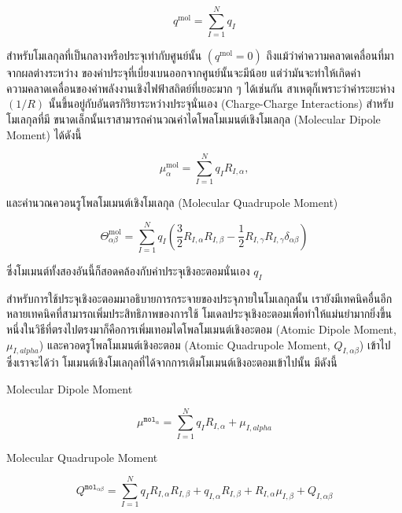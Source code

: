 \begin{equation}
    q^{\mathrm{mol}}
    =
    \sum_{I=1}^N q_I
\end{equation}

\noindent สำหรับโมเลกุลที่เป็นกลางหรือประจุเท่ากับศูนย์นั้น $(q^{\mathrm{mol}} = 0)$ ถึงแม้ว่าค่าความคลาดเคลื่อนที่มาจากผลต่างระหว่าง%
ของค่าประจุที่เบี่ยงเบนออกจากศูนย์นั้นจะมีน้อย แต่ว่ามันจะทำให้เกิดค่าความคลาดเคลื่อนของค่าพลังงานเชิงไฟฟ้าสถิตย์ที่เยอะมาก ๆ ได้เช่นกัน
สาเหตุก็เพราะว่าค่าระยะห่าง $(1 / R)$ นั้นขึ้นอยู่กับอันตรกิริยาระหว่างประจุนั่นเอง (Charge-Charge Interactions) สำหรับโมเลกุลที่มี%
ขนาดเล็กนั้นเราสามารถคำนวณค่าไดโพลโมเมนต์เชิงโมเลกุล (Molecular Dipole Moment) ได้ดังนี้

\begin{equation}
    \mu_\alpha^{\mathrm{mol}}
    =
    \sum_{I=1}^N q_I R_{I, \alpha},
\end{equation}

\noindent และคำนวณควอนรูโพลโมเมนต์เชิงโมเลกุล (Molecular Quadrupole Moment)

\begin{equation}
    \Theta_{\alpha \beta}^{\mathrm{mol}}
    =
    \sum_{I=1}^N q_I
    \left(
    \frac{3}{2} R_{I, \alpha} R_{I, \beta}
    -\frac{1}{2} R_{I, \gamma} R_{I, \gamma} \delta_{\alpha \beta}
    \right)
\end{equation}

\noindent ซึ่งโมเมนต์ทั้งสองอันนี้ก็สอดคล้องกับค่าประจุเชิงอะตอมนั่นเอง $q_I$

สำหรับการใช้ประจุเชิงอะตอมมาอธิบายการกระจายของประจุภายในโมเลกุลนั้น เรายังมีเทคนิคอื่นอีกหลายเทคนิคที่สามารถเพิ่มประสิทธิภาพของการใช้%
โมเดลประจุเชิงอะตอมเพื่อทำให้แม่นยำมากยิ่งขึ้น หนึ่งในวิธีที่ตรงไปตรงมาก็คือการเพิ่มเทอมไดโพลโมเมนต์เชิงอะตอม (Atomic Dipole Moment,
$\mu_{I,alpha}$) และควอดรูโพลโมเมนต์เชิงอะตอม (Atomic Quadrupole Moment, $Q_{I,\alpha \beta}$) เข้าไป ซึ่งเราจะได้ว่า%
โมเมนต์เชิงโมเลกุลที่ได้จากการเติมโมเมนต์เชิงอะตอมเข้าไปนั้น มีดังนี้

\noindent Molecular Dipole Moment

\begin{equation}
    \label{eq:mol_moment_mu}
    \mu^{\texttt{mol}_{\alpha}}
    =
    \sum^{N}_{I=1} q_{I} R_{I,\alpha} + \mu_{I,alpha}
\end{equation}

\noindent Molecular Quadrupole Moment

\begin{equation}
    \label{eq:mol_moment_Q}
    Q^{\texttt{mol}_{\alpha \beta}}
    =
    \sum^{N}_{I=1} q_{I} R_{I,\alpha} R_{I,\beta}
    + q_{I,\alpha} R_{I,\beta}
    + R_{I,\alpha} \mu_{I,\beta}
    + Q_{I,\alpha \beta}
\end{equation}

